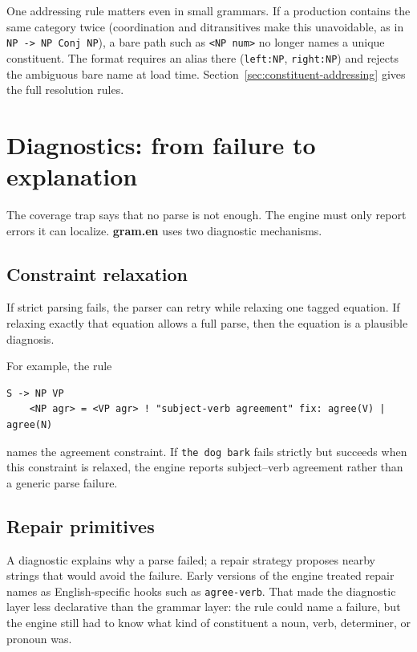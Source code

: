 \documentclass[11pt]{article}
\theoremstyle{definition}
\theoremstyle{plain}
\theoremstyle{remark}
\newcommand{\Gram}{\textbf{gram.en}}
\begin{document}
One addressing rule matters even in small grammars. If a production contains the
same category twice (coordination and ditransitives make this unavoidable, as in
\texttt{NP -> NP Conj NP}), a bare path such as \texttt{<NP num>} no longer names a
unique constituent. The format requires an alias there (\texttt{left:NP},
\texttt{right:NP}) and rejects the ambiguous bare name at load time.
Section~\ref{sec:constituent-addressing} gives the full resolution rules.

\section{Diagnostics: from failure to explanation}

The coverage trap says that no parse is not enough. The engine must only report errors it can
localize. \Gram{} uses two diagnostic mechanisms.

\subsection{Constraint relaxation}

If strict parsing fails, the parser can retry while relaxing one tagged equation. If relaxing
exactly that equation allows a full parse, then the equation is a plausible diagnosis.

For example, the rule

\begin{lstlisting}[language=gram]
S -> NP VP
    <NP agr> = <VP agr> ! "subject-verb agreement" fix: agree(V) | agree(N)
\end{lstlisting}

names the agreement constraint. If \texttt{the dog bark} fails strictly but succeeds when this
constraint is relaxed, the engine reports subject--verb agreement rather than a generic parse
failure.

\subsection{Repair primitives}

A diagnostic explains why a parse failed; a repair strategy proposes nearby
strings that would avoid the failure. Early versions of the engine treated
repair names as English-specific hooks such as \texttt{agree-verb}. That made
the diagnostic layer less declarative than the grammar layer: the rule could
name a failure, but the engine still had to know what kind of constituent a noun,
verb, determiner, or pronoun was.
\end{document}
